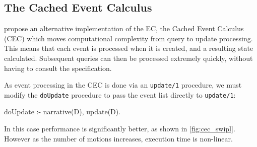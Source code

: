 \subsection{The Cached Event Calculus}

\citet{Chittaro1996} propose an alternative implementation of the \ac{EC}, the
Cached Event Calculus (CEC) which
moves computational complexity from query to update processing. This means that
each event is processed when it is created, and a resulting state calculated.
Subsequent queries can then be processed extremely quickly, without having to
consult the specification.

As event processing in the CEC is done via an \texttt{update/1} procedure, we
must modify the \texttt{doUpdate} procedure to pass the event list directly to
\texttt{update/1}:

\begin{prologinline}
doUpdate :-
	narrative(D),
	update(D).
\end{prologinline}

In this case performance is significantly better, as shown in
\autoref{fig:cec_swipl}. However as the number of motions increases, execution
time is non-linear.


